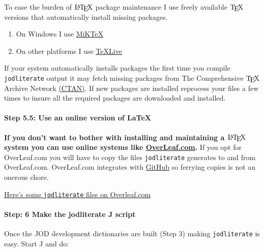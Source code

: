 \documentclass[11pt]{article}
\providecommand{\tightlist}{%
      \setlength{\itemsep}{0pt}\setlength{\parskip}{0pt}}
\let\Oldtex\TeX
\let\Oldlatex\LaTeX
\renewcommand{\TeX}{\textrm{\Oldtex}}
\renewcommand{\LaTeX}{\textrm{\Oldlatex}}
\begin{document}
To ease the burden of \(\LaTeX\) package maintenance I use freely
available \(\TeX\) versions that automatically install missing packages.

\begin{enumerate}
\def\labelenumi{\arabic{enumi}.}
\tightlist
\item
  On Windows I use \href{https://miktex.org/}{MiKTeX}
\item
  On other platforms I use
  \href{https://en.wikipedia.org/wiki/TeX_Live}{TeXLive}
\end{enumerate}

If your system automatically installs packages the first time you
compile \texttt{jodliterate} output it may fetch missing packages from
The Comprehensive \(\TeX\) Archive Network
\href{https://www.ctan.org/}{(CTAN)}. If new packages are installed
reprocess your files a few times to insure all the required packages are
downloaded and installed.

    \hypertarget{step-5.5-use-an-online-version-of-latex}{%
\paragraph{Step 5.5: Use an online version of
LaTeX}\label{step-5.5-use-an-online-version-of-latex}}

\textbf{If you don't want to bother with installing and maintaining a
\(\LaTeX\) system you can use online systems like
\href{https://www.overleaf.com}{OverLeaf.com}.} If you opt for
OverLeaf.com you will have to copy the files \texttt{jodliterate}
generates to and from OverLeaf.com. OverLeaf.com integrates with
\href{https://github.com/}{GitHub} so ferrying copies is not an onerous
chore.

\href{https://www.overleaf.com/read/tckqdmcjfkqw}{Here's some
\texttt{jodliterate} files on Overleaf.com}

    \hypertarget{step-6-make-the-jodliterate-j-script}{%
\paragraph{Step: 6 Make the jodliterate J
script}\label{step-6-make-the-jodliterate-j-script}}

Once the JOD development dictionaries are built (Step 3) making
\texttt{jodliterate} is easy. Start J and do:
\end{document}
